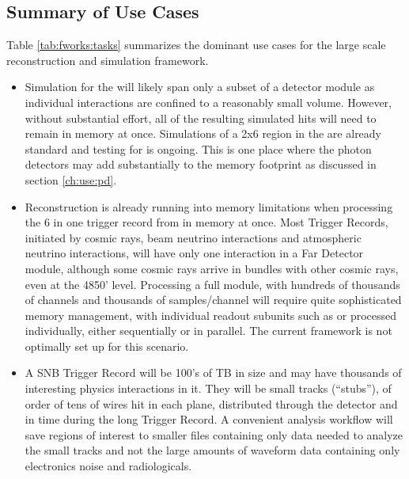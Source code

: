 \documentclass[../main-v1.tex]{subfiles}
\begin{document}
\subsection{Summary of Use Cases}
Table \ref{tab:fworks:tasks} summarizes the dominant use cases for the large scale reconstruction and simulation framework.

\begin{itemize}
\item Simulation for the  will likely span only a subset of a detector module as individual interactions are confined to a reasonably small volume. However, without substantial effort, all of the resulting simulated hits will need to remain in memory at once. Simulations of a 2x6  region in the  are already standard and testing for  is ongoing. This is one place where the photon detectors may add substantially to the memory footprint as discussed in section \ref{ch:use:pd}. 

\item Reconstruction is already running into memory limitations when processing the 6  in one trigger record from  in memory at once.
 Most  Trigger Records, initiated by cosmic rays, beam neutrino interactions and atmospheric neutrino interactions, will have only one interaction in a Far Detector module, although  some cosmic rays arrive in bundles with other cosmic rays, even at the 4850’ level.
Processing a full  module, with hundreds of thousands of channels and thousands of samples/channel will require quite sophisticated memory management, with individual readout subunits such as  or  processed individually, either sequentially or in parallel.  The current  framework is not optimally set up for this scenario. 



\item A SNB Trigger Record will be 100's of TB in size and may have thousands of interesting physics interactions in it.  They will be small tracks (“stubs”), of order of tens of wires hit in each plane, distributed through the detector and in time during the long Trigger Record.  A convenient analysis workflow will save regions of interest to smaller files containing only data needed to analyze the small tracks and not the large amounts of waveform data containing only electronics noise and radiologicals. 



\end{itemize}
\end{document}
